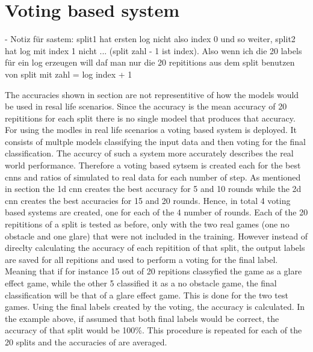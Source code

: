 \chapter{Voting based system}

- Notiz für sastem: split1 hat ersten log nicht also index 0 und so weiter, split2 hat log mit index 1 nicht ... (split zahl - 1 ist index). Also wenn ich die 20 labels für ein log erzeugen will daf man nur die 20 repititions aus dem split benutzen von split mit zahl = log index + 1




The accuracies shown in section  are not representitive of how the models would be used in resal life scenarios. Since the accuracy is the mean accuracy of 20 repititions for each split there is no single modeel that produces that accuracy. For using the modles in real life scenarios a voting based system is deployed. It consists of multple models classifying the input data and then voting for the final classification. The accurcy of such a system more accurately describes the real world performance. Therefore a voting based sytsem is created each for the best cnns and ratios of simulated to real data for each number of step. As mentioned in section  the 1d cnn creates the best accuracy for 5 and 10 rounds while the 2d cnn creates the best accuracies for 15 and 20 rounds. Hence, in total 4 voting based systems are created, one for each of the 4 number of rounds. Each of the 20 repititions of a split is tested as before, only with the two real games (one no obstacle and one glare) that were not included in the training. However instead of direclty calculating the accuracy of each repitition of that split, the output labels are saved for all repitions and used to perform a voting for the final label. Meaning that if for instance 15 out of 20 repitions classyfied the game as a glare effect game, while the other 5 classified it as a no obstacle game, the final classification will be that of a glare effect game. This is done for the two test games. Using the final labels created by the voting, the accuracy is calculated. In the example above, if assumed that both final labels would be correct, the accuracy of that split would be 100\%. This procedure is repeated for each of the 20 splits and the accuracies of are averaged. 

